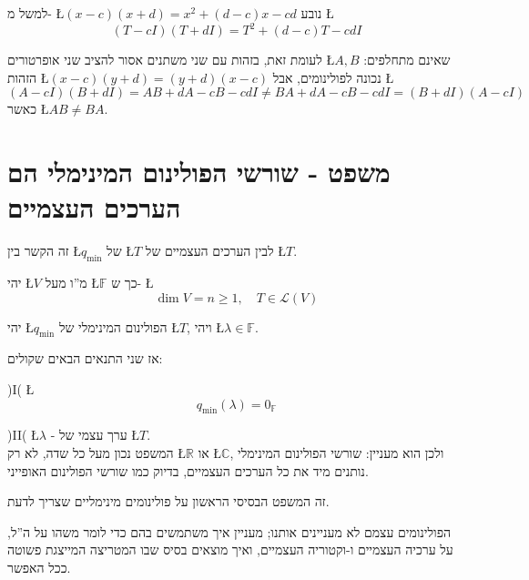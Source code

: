\documentclass[english,hebrew]{article}
\begin{document}
למשל מ- \L{$(x-c)(x+d)=x^{2}+(d-c)x-cd$} נובע \L{%
\[
(T-cI)(T+dI)=T^{2}+(d-c)T-cdI
\]
}%

לעומת זאת, בזהות עם שני משתנים אסור להציב שני אופרטורים \L{$A,B$}
שאינם מתחלפים: הזהות \L{$(x-c)(y+d)=(y+d)(x-c)$} נכונה לפולינומים,
אבל \L{%
\[
(A-cI)(B+dI)=AB+dA-cB-cdI\ne BA+dA-cB-cdI=(B+dI)(A-cI)
\]
}%
כאשר \L{$AB\ne BA$}.

\section{משפט - שורשי הפולינום המינימלי הם הערכים העצמיים}

זה הקשר בין \L{$q_{\text{min}}$} של \L{$T$} לבין הערכים העצמיים
של \L{$T$}.

יהי \L{$V$} מ\textquotedblright ו מעל \L{$\mathbb{F}$} כך ש- \L{%
\[
\dim V=n\geq1,\quad T\in\mathcal{L}(V)
\]
}%

יהי \L{$q_{\min}$} הפולינום המינימלי של \L{$T$}, ויהי \L{$\lambda\in\mathbb{F}$}.

אז שני התנאים הבאים שקולים:

)I( \L{%
\[
q_{\min}(\lambda)=0_{\mathbb{F}}
\]
}%

)II( \L{$\lambda$} - ערך עצמי של \L{$T$}.\\

המשפט נכון מעל כל שדה, לא רק \L{$\mathbb{R}$} או \L{$\mathbb{C}$},
ולכן הוא מעניין: שורשי הפולינום המינימלי נותנים מיד את כל הערכים העצמיים,
בדיוק כמו שורשי הפולינום האופייני.

זה המשפט הבסיסי הראשון על פולינומים מינימליים שצריך לדעת. 

הפולינומים עצמם לא מעניינים אותנו; מעניין איך משתמשים בהם כדי לומר
משהו על ה\textquotedblright ל, על ערכיה העצמיים ו-וקטוריה העצמיים,
ואיך מוצאים בסיס שבו המטריצה המייצגת פשוטה ככל האפשר.
\end{document}
